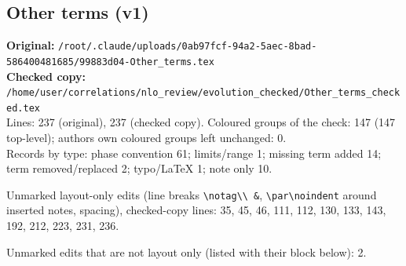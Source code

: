 \documentclass[10pt]{article}
\begin{document}
\subsection{Other terms (v1)}\label{sec:file-other_terms}
\noindent\textbf{Original:} \texttt{/root/.claude/uploads/0ab97fcf-94a2-5aec-8bad-586400481685/99883d04-Other\_terms.tex}\\\textbf{Checked copy:} \texttt{/home/user/correlations/nlo\_review/evolution\_checked/Other\_terms\_checked.tex}\\
Lines: 237 (original), 237 (checked copy). Coloured groups of the check: 147 (147 top-level); author\textquotesingle s own coloured groups left unchanged: 0.\\
Records by type: phase convention 61; limits/range 1; missing term added 14; term removed/replaced 2; typo/LaTeX 1; note only 10.
\par\noindent Unmarked layout-only edits (line breaks \texttt{\textbackslash notag\textbackslash\textbackslash\ \&}, \texttt{\textbackslash par\textbackslash noindent} around inserted notes, spacing), checked-copy lines: 35, 45, 46, 111, 112, 130, 133, 143, 192, 212, 223, 231, 236.
\par\noindent Unmarked edits that are not layout only (listed with their block below): 2.
\end{document}
